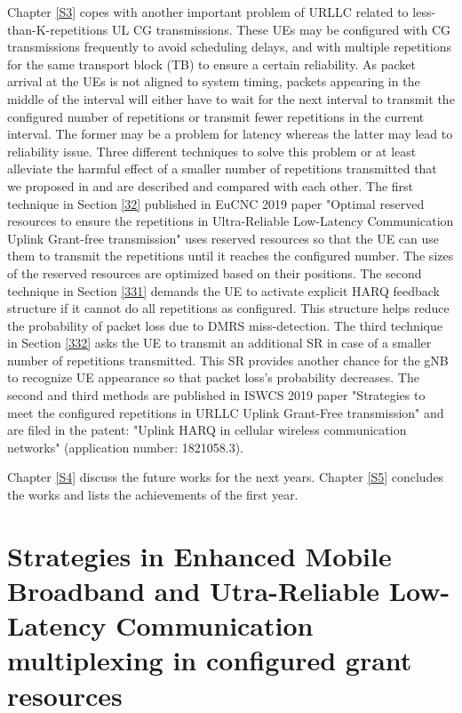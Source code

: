 \documentclass{report}
\begin{document}
Chapter \ref{S3} copes with another important problem of URLLC related to less-than-K-repetitions UL CG transmissions. These UEs may be configured with CG transmissions frequently to avoid scheduling delays, and with multiple repetitions for the same transport block (TB) to ensure a certain reliability. As packet arrival at the UEs is not aligned to system timing, packets appearing in the middle of the interval will either have to wait for the next interval to transmit the configured number of repetitions or transmit fewer repetitions in the current interval. The former may be a problem for latency whereas the latter may lead to reliability issue. Three different techniques to solve this problem or at least alleviate the harmful effect of a smaller number of repetitions transmitted that we proposed in \cite{b9} and \cite{ad100} are described and compared with each other. The first technique in Section \ref{32} published in EuCNC 2019 paper "Optimal reserved resources to ensure the repetitions in Ultra-Reliable Low-Latency Communication Uplink Grant-free transmission" \cite{b9} uses reserved resources so that the UE can use them to transmit the repetitions until it reaches the configured number. The sizes of the reserved resources are optimized based on their positions. The second technique in Section \ref{331} demands the UE to activate explicit HARQ feedback structure if it cannot do all repetitions as configured. This structure helps reduce the probability of packet loss due to DMRS miss-detection. The third technique in Section \ref{332} asks the UE to transmit an additional SR in case of a smaller number of repetitions transmitted. This SR provides another chance for the gNB to recognize UE appearance so that packet loss's probability decreases. The second and third methods are published in ISWCS 2019 paper "Strategies to meet the configured repetitions in URLLC Uplink Grant-Free transmission" and are filed in the patent: "Uplink HARQ in cellular wireless communication networks" (application number: 1821058.3). 

Chapter \ref{S4} discuss the future works for the next years. Chapter \ref{S5} concludes the works and lists the achievements of the first year.


\chapter{Strategies in Enhanced Mobile Broadband and Utra-Reliable Low-Latency Communication multiplexing in configured grant resources} \label{S2}
\end{document}
